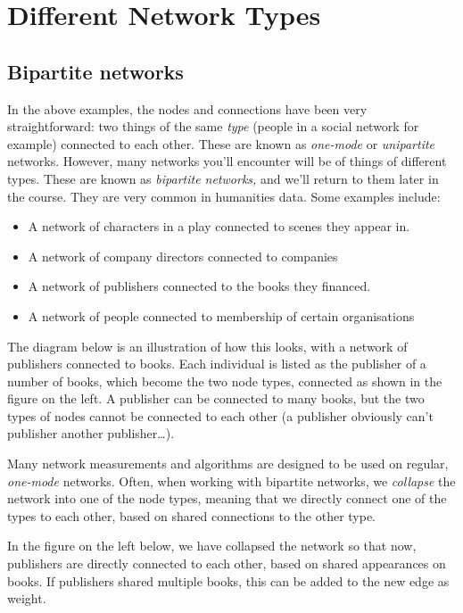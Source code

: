 \documentclass[
]{book}
\begin{document}
\hypertarget{different-network-types}{%
\section{Different Network Types}\label{different-network-types}}

\hypertarget{bipartite-networks}{%
\subsection{Bipartite networks}\label{bipartite-networks}}

In the above examples, the nodes and connections have been very straightforward: two things of the same \emph{type} (people in a social network for example) connected to each other. These are known as \emph{one-mode} or \emph{unipartite} networks. However, many networks you'll encounter will be of things of different types. These are known as \emph{bipartite networks,} and we'll return to them later in the course. They are very common in humanities data. Some examples include:

\begin{itemize}
\item
  A network of characters in a play connected to scenes they appear in.
\item
  A network of company directors connected to companies
\item
  A network of publishers connected to the books they financed.
\item
  A network of people connected to membership of certain organisations
\end{itemize}

The diagram below is an illustration of how this looks, with a network of publishers connected to books. Each individual is listed as the publisher of a number of books, which become the two node types, connected as shown in the figure on the left. A publisher can be connected to many books, but the two types of nodes cannot be connected to each other (a publisher obviously can't publisher another publisher\ldots).

Many network measurements and algorithms are designed to be used on regular, \emph{one-mode} networks. Often, when working with bipartite networks, we \emph{collapse} the network into one of the node types, meaning that we directly connect one of the types to each other, based on shared connections to the other type.

In the figure on the left below, we have collapsed the network so that now, publishers are directly connected to each other, based on shared appearances on books. If publishers shared multiple books, this can be added to the new edge as weight.
\end{document}
